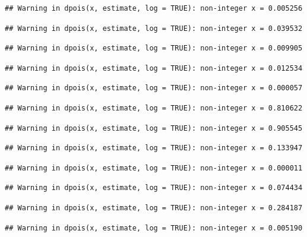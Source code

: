 \documentclass[]{article}
\begin{document}
\begin{verbatim}
## Warning in dpois(x, estimate, log = TRUE): non-integer x = 0.005256
\end{verbatim}

\begin{verbatim}
## Warning in dpois(x, estimate, log = TRUE): non-integer x = 0.039532
\end{verbatim}

\begin{verbatim}
## Warning in dpois(x, estimate, log = TRUE): non-integer x = 0.009905
\end{verbatim}

\begin{verbatim}
## Warning in dpois(x, estimate, log = TRUE): non-integer x = 0.012534
\end{verbatim}

\begin{verbatim}
## Warning in dpois(x, estimate, log = TRUE): non-integer x = 0.000057
\end{verbatim}

\begin{verbatim}
## Warning in dpois(x, estimate, log = TRUE): non-integer x = 0.810622
\end{verbatim}

\begin{verbatim}
## Warning in dpois(x, estimate, log = TRUE): non-integer x = 0.905545
\end{verbatim}

\begin{verbatim}
## Warning in dpois(x, estimate, log = TRUE): non-integer x = 0.133947
\end{verbatim}

\begin{verbatim}
## Warning in dpois(x, estimate, log = TRUE): non-integer x = 0.000011
\end{verbatim}

\begin{verbatim}
## Warning in dpois(x, estimate, log = TRUE): non-integer x = 0.074434
\end{verbatim}

\begin{verbatim}
## Warning in dpois(x, estimate, log = TRUE): non-integer x = 0.284187
\end{verbatim}

\begin{verbatim}
## Warning in dpois(x, estimate, log = TRUE): non-integer x = 0.005190
\end{verbatim}
\end{document}
